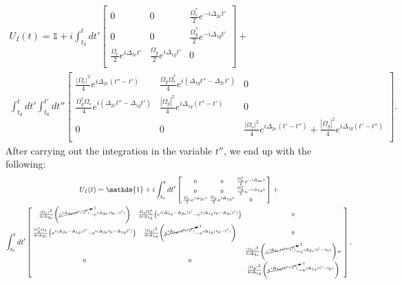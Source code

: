 \begin{multline}
U_I(t)=\mathds{1}+i\int_{t_0}^t dt'
\begin{bmatrix}
0 & 0 & \frac{\Omega_e^*}{2}e^{-i\Delta_{2e}t'} \\
0 & 0 & \frac{\Omega_g^*}{2}e^{-i\Delta_{1g}t'}\\
\frac{\Omega_e}{2}e^{i\Delta_{2e}t'} & \frac{\Omega_{g}}{2}e^{i\Delta_{1g}t'} & 0 \\
\end{bmatrix}
+ \\
\int_{t_0}^t dt' 
\int_{t_0}^{t'}dt'' 
\begin{bmatrix}
\frac{|\Omega_e|^2}{4}e^{i\Delta_{2e}(t''-t')} & \frac{\Omega_g\Omega_e^*}{4}e^{i(\Delta_{1g}t''-\Delta_{2e}t')} & 0 \\
\frac{\Omega_g^*\Omega_e}{4}e^{i(\Delta_{2e}t''-\Delta_{1g}t')} & \frac{|\Omega_g|^2}{4} e^{i\Delta_{1g}(t''-t')}& 0\\
0 & 0 & \frac{|\Omega_e|^2}{4}e^{i\Delta_{2e}(t'-t'')}+\frac{|\Omega_g|^2}{4}e^{i\Delta_{1g}(t'-t'')}\\
\end{bmatrix}.
\end{multline}
After carrying out the integration in the variable $t''$, we end up with the following:
\begin{multline}
U_I(t)=\mathds{1}+i\int_{t_0}^t dt'
\left[\begin{smallmatrix}
0 & 0 & \frac{\Omega_e^*}{2}e^{-i\Delta_{2e}t} \\
0 & 0 & \frac{\Omega_g^*}{2}e^{-i\Delta_{1g}t}\\
\frac{\Omega_e}{2}e^{i\Delta_{2e}t} & \frac{\Omega_{g}}{2}e^{i\Delta_{1g}t} & 0 \\
\end{smallmatrix}\right]
+ \\
\int_{t_0}^t dt' 
\left[
\begin{smallmatrix}
\frac{|\Omega_e|^2}{4i\Delta_{2e}}\left(\cancelto{1}{e^{i\Delta_{2e}(t'-t')}}-e^{i\Delta_{2e}(t_0-t')}\right)
 & \frac{\Omega_g\Omega_e^*}{4i\Delta_{1g}}\left(e^{i(\Delta_{1g}-\Delta_{2e})t'}-e^{i(\Delta_{1g}t_0-\Delta_{2e}t')}\right) & 0 \\
\frac{\Omega_g^*\Omega_e}{4i\Delta_{2e}}\left(e^{i(\Delta_{2e}-\Delta_{1g})t'}-e^{i(\Delta_{2e}t_0-\Delta_{1g}t')}\right) 
& \frac{|\Omega_g|^2}{4i\Delta_{1g}}\left(\cancelto{1}{e^{i\Delta_{1g}(t'-t')}}-e^{i\Delta_{1g}(t_0-t')}\right)
& 0\\
0 & 0 & \begin{smallmatrix}
\frac{|\Omega_e|^2}{4i\Delta_{2e}}\left(\cancelto{1}{e^{i\Delta_{2e}(t'-t')}}-e^{i\Delta_{2e}(t'-t_0)}\right) + 
\\ \frac{|\Omega_g|^2}{4i\Delta_{1g}}\left(\cancelto{1}{e^{i\Delta_{1g}(t'-t')}}-e^{i\Delta_{1g}(t'-t_0)}\right)\end{smallmatrix}\\
\end{smallmatrix}
\right].\label{blastedIntegral}
\end{multline}
